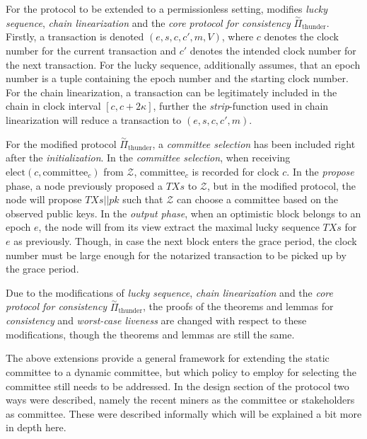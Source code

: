 
For the protocol to be extended to a permissionless setting, \cite{thunderella} modifies \emph{lucky sequence}, \emph{chain linearization} and the \emph{core protocol for consistency} $\overset{\sim}{\Pi}_\text{thunder}$. Firstly, a transaction is denoted $(e,s,c,c',m,V)$, where $c$ denotes the clock number for the current transaction and $c'$ denotes the intended clock number for the next transaction. For the lucky sequence, \cite{thunderella} additionally assumes, that an epoch number is a tuple containing the epoch number and the starting clock number. For the chain linearization, a transaction can be legitimately included in the chain in clock interval $[c, c+2\kappa]$, further the \emph{strip}-function used in chain linearization will reduce a transaction to $(e,s,c,c',m)$. 

For the modified protocol $\overset{\sim}{\Pi}_\text{thunder}$, a \emph{committee selection} has been included right after the \emph{initialization}. In the \emph{committee selection}, when receiving $\text{elect}(c,\text{committee}_c)$ from $\mathcal{Z}$, $\text{committee}_c$ is recorded for clock $c$. In the \emph{propose} phase, a node previously proposed a $TXs$ to $\mathcal{Z}$, but in the modified protocol, the node will propose $TXs||pk$ such that $\mathcal{Z}$ can choose a committee based on the observed public keys. In the \emph{output phase}, when an optimistic block belongs to an epoch $e$, the node will from its view extract the maximal lucky sequence $TXs$ for $e$ as previously. Though, in case the next block enters the grace period, the clock number must be large enough for the notarized transaction to be picked up by the grace period.

Due to the modifications of \emph{lucky sequence}, \emph{chain linearization} and the \emph{core protocol for consistency} $\overset{\sim}{\Pi}_\text{thunder}$, the proofs of the theorems and lemmas for \emph{consistency} and \emph{worst-case liveness} are changed with respect to these modifications, though the theorems and lemmas are still the same.


The above extensions provide a general framework for extending the static committee to a dynamic committee, but which policy to employ for selecting the committee still needs to be addressed. In the design section of the protocol two ways were described, namely the recent miners as the committee or stakeholders as committee. These were described informally which will be explained a bit more in depth here.

